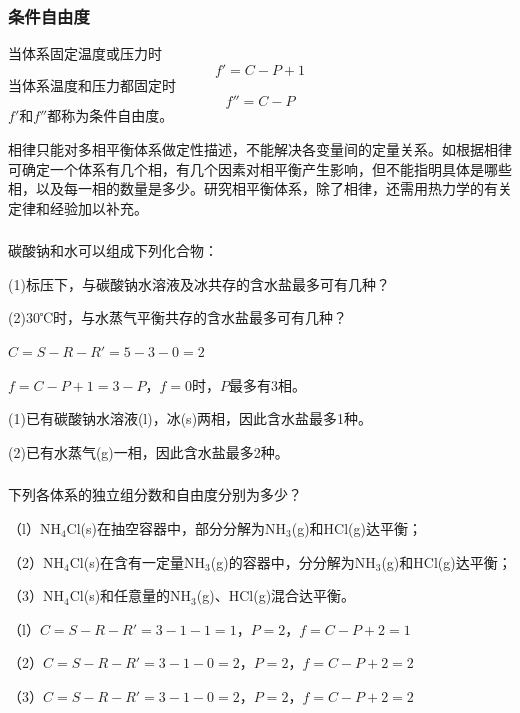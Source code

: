 \begin{frame}
    \frametitle{条件自由度}

    当体系固定温度或压力时
    {$$f'=C-P+1$$}
    当体系温度和压力都固定时
    {$$f''=C-P$$}
    $f'$和$f''$都称为条件自由度。
    
    相律只能对多相平衡体系做定性描述，不能解决各变量间的定量关系。如根据相律可确定一个体系有几个相，有几个因素对相平衡产生影响，但不能指明具体是哪些相，以及每一相的数量是多少。研究相平衡体系，除了相律，还需用热力学的有关定律和经验加以补充。

\end{frame}


\begin{frame}[t]
    \frametitle{}

    \begin{example}
        碳酸钠和水可以组成下列化合物：


    (1)标压下，与碳酸钠水溶液及冰共存的含水盐最多可有几种？

    (2)30℃时，与水蒸气平衡共存的含水盐最多可有几种？ 

    \end{example}\pause

    $C=S-R-R'=5-3-0=2$

    $f=C-P+1=3-P$，$f=0$时，$P$最多有3相。

    (1)已有碳酸钠水溶液(l)，冰(s)两相，因此含水盐最多1种。

    (2)已有水蒸气(g)一相，因此含水盐最多2种。

\end{frame}


\begin{frame}[t]
    \frametitle{}

    \begin{example}
        下列各体系的独立组分数和自由度分别为多少？

    （l）NH$_4$Cl(s)在抽空容器中，部分分解为NH$_3$(g)和HCl(g)达平衡；

    （2）NH$_4$Cl(s)在含有一定量NH$_3$(g)的容器中，分分解为NH$_3$(g)和HCl(g)达平衡；

    （3）NH$_4$Cl(s)和任意量的NH$_3$(g)、HCl(g)混合达平衡。
    \end{example}\pause

    （l）$C=S-R-R'=3-1-1=1$，$P=2$，$f=C-P+2=1$

    （2）$C=S-R-R'=3-1-0=2$，$P=2$，$f=C-P+2=2$

    （3）$C=S-R-R'=3-1-0=2$，$P=2$，$f=C-P+2=2$

\end{frame}